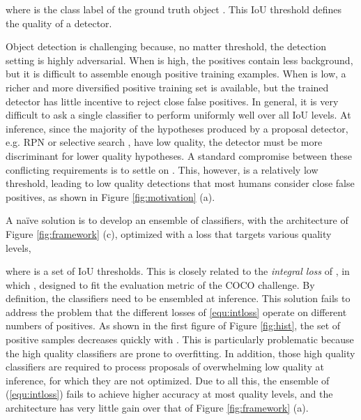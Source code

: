 \documentclass[10pt,twocolumn,letterpaper]{article}
\begin{document}
where  is the class label of the ground truth object . This IoU threshold  defines the quality of a detector.

Object detection is challenging because, no matter threshold, the detection
setting is highly adversarial. When  is high, the positives contain
less background, but it is difficult to assemble enough positive training
examples. When  is low, a richer and more diversified positive training
set is available, but the trained detector has little incentive to reject
close false positives. In general, it is very difficult to ask a single
classifier to perform uniformly well over all IoU levels. At inference,
since the majority of the hypotheses produced by a proposal detector,
e.g. RPN \cite{DBLP:conf/nips/RenHGS15} or selective
search \cite{DBLP:journals/ijcv/UijlingsSGS13}, have low quality, the detector
must be more discriminant for lower quality hypotheses. A standard
compromise between these conflicting requirements is to settle on .
This, however, is a relatively low threshold, leading to low quality
detections that most humans consider close false positives, as shown in
Figure \ref{fig:motivation} (a).

A na\"ive solution is to develop an ensemble of classifiers, with the
architecture of Figure \ref{fig:framework} (c), optimized with
a loss that targets various quality levels,

where  is a set of IoU thresholds. This is closely related
to the \textit{integral loss} of \cite{DBLP:conf/bmvc/ZagoruykoLLPGCD16}, in
which , designed to fit the evaluation
metric of the COCO challenge. By definition, the classifiers need to be
ensembled at inference. This solution fails to address the problem that
the different losses of \eqref{equ:intloss} operate on different numbers of
positives. As shown in the first figure of Figure \ref{fig:hist}, the set of
positive samples decreases quickly with . This is particularly
problematic because the high quality classifiers are prone to overfitting.
In addition, those high quality classifiers are required to process
proposals of overwhelming low quality at inference, for which they are not
optimized. Due to all this, the ensemble of (\ref{equ:intloss})
fails to achieve higher accuracy at most quality levels, and the architecture
has very little gain over that of Figure \ref{fig:framework} (a).
\end{document}
